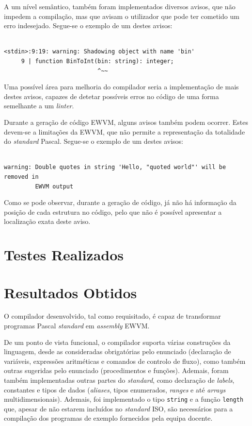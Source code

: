 \documentclass[12pt, a4paper]{article}
\begin{document}
A um nível semântico, também foram implementados diversos avisos, que não impedem a compilação, mas
que avisam o utilizador que pode ter cometido um erro indesejado. Segue-se o exemplo de um destes
avisos:


\begin{lstlisting}

<stdin>:9:19: warning: Shadowing object with name 'bin'
     9 | function BinToInt(bin: string): integer;
                           ^~~
\end{lstlisting}

Uma possível área para melhoria do compilador seria a implementação de mais destes avisos, capazes
de detetar possíveis erros no código de uma forma semelhante a um \emph{linter}.

Durante a geração de código EWVM, alguns avisos também podem ocorrer. Estes devem-se a limitações da
EWVM, que não permite a representação da totalidade do \emph{standard} Pascal. Segue-se o exemplo de
um destes avisos:

\begin{lstlisting}

warning: Double quotes in string 'Hello, "quoted world"' will be removed in
         EWVM output
\end{lstlisting}

Como se pode observar, durante a geração de código, já não há informação da posição de cada
estrutura no código, pelo que não é possível apresentar a localização exata deste aviso.

\section{Testes Realizados}

\section{Resultados Obtidos}

O compilador desenvolvido, tal como requisitado, é capaz de transformar programas Pascal
\emph{standard} em \emph{assembly} EWVM.

De um ponto de vista funcional, o compilador suporta várias construções da linguagem, desde as
consideradas obrigatórias pelo enunciado (declaração de variáveis, expressões aritméticas e comandos
de controlo de fluxo), como também outras sugeridas pelo enunciado (procedimentos e funções).
Ademais, foram também implementadas outras partes do \emph{standard}, como declaração de
\emph{labels}, constantes e tipos de dados (\emph{aliases}, tipos enumerados, \emph{ranges} e até
\emph{arrays} multidimensionais). Ademais, foi implementado o tipo \texttt{string} e a função
\texttt{length} que, apesar de não estarem incluídos no \emph{standard} ISO, são necessários para a
compilação dos programas de exemplo fornecidos pela equipa docente.
\end{document}
